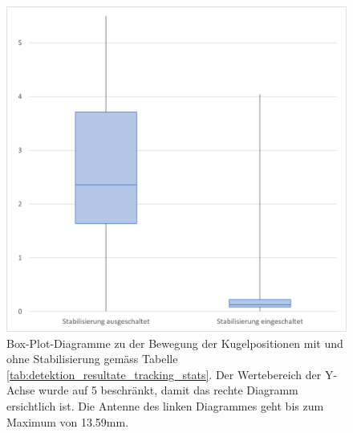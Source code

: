 \begin{figure}[h!]
    \begin{center}
        \includegraphics[width=0.5\linewidth]{../common/04_results/resources/stabilisierung_boxplot.png}
    \end{center}
    \caption{
        Box-Plot-Diagramme zu der Bewegung der Kugelpositionen mit und ohne Stabilisierung
        gemäss Tabelle \ref{tab:detektion_resultate_tracking_stats}.
        Der Wertebereich der Y-Achse wurde auf 5 beschränkt, damit das rechte Diagramm ersichtlich ist.
        Die Antenne des linken Diagrammes geht bis zum Maximum von 13.59mm.
    }
    \label{fig:detektion_resultate_tracking_boxplot}
\end{figure}
